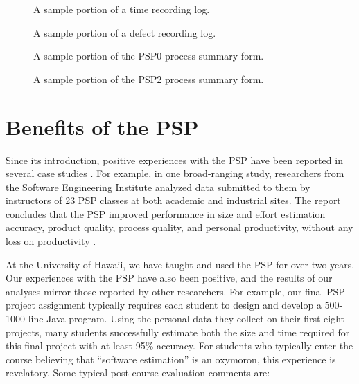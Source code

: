   \begin{figure} [tp]
    {\centerline{}}
    \caption{\label{time}A sample portion of a time recording log.}
  \end{figure}

  \begin{figure} [tp]
    {\centerline{}}
    \caption{\label{defects}A sample portion of a defect recording log.}
  \end{figure}

  \begin{figure} [tp]
    {\centerline{}}
    \caption{\label{psp0}A sample portion of the PSP0 process summary form.}
  \end{figure}

  \begin{figure} [tp]
    {\centerline{}}
    \caption{\label{psp2}A sample portion of the PSP2 process summary form.}
  \end{figure}


\section{Benefits of the PSP}

Since its introduction, positive experiences with the PSP have been
reported in several case studies \cite{Ramsey96,Shostak96,Ferguson97}.  For
example, in one broad-ranging study, researchers from the Software
Engineering Institute analyzed data submitted to them by instructors of 23
PSP classes at both academic and industrial sites.  The report concludes
that the PSP improved performance in size and effort estimation accuracy,
product quality, process quality, and personal productivity, without any
loss on productivity \cite{CMU97}.

At the University of Hawaii, we have taught and used the PSP for over two
years.  Our experiences with the PSP have also been positive, and the
results of our analyses mirror those reported by other researchers. For
example, our final PSP project assignment typically requires each student
to design and develop a 500-1000 line Java program. Using the
personal data they collect on their first eight projects, many students
successfully estimate both the size and time required for this final project
with at least 95\% accuracy.  For students who typically enter the course
believing that ``software estimation'' is an oxymoron, this experience is
revelatory. Some typical post-course evaluation comments are:

